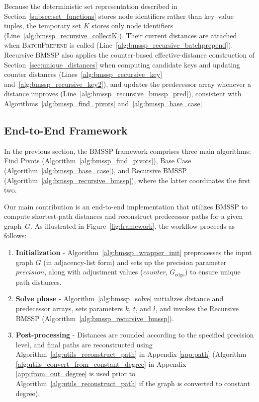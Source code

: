 \documentclass[ijoc,blindrev]{informs3} %
\begin{document}
Because the deterministic set representation described in Section~\ref{subsec:set_functions} stores node identifiers rather than key--value tuples, the temporary set $K$ stores only node identifiers (Line~\ref{alg:bmssp_recursive_collectK}). Their current distances are attached when \textsc{BatchPrepend} is called (Line~\ref{alg:bmssp_recursive_batchprepend}). Recursive BMSSP also applies the counter-based effective-distance construction of Section~\ref{sec:unique_distances} when computing candidate keys and updating counter distances (Lines~\ref{alg:bmssp_recursive_key} and~\ref{alg:bmssp_recursive_key2}), and updates the predecessor array whenever a distance improves (Line~\ref{alg:bmssp_recursive_bmssp_pred}), consistent with Algorithms~\ref{alg:bmssp_find_pivots} and~\ref{alg:bmssp_base_case}.




\subsection{End-to-End Framework}\label{subsec:alg_framework}

In the previous section, the BMSSP framework comprises three main algorithms: Find Pivots (Algorithm~\ref{alg:bmssp_find_pivots}), Base Case (Algorithm~\ref{alg:bmssp_base_case}), and Recursive BMSSP (Algorithm~\ref{alg:bmssp_recursive_bmssp}), where the latter coordinates the first two.

Our main contribution is an end-to-end implementation that utilizes BMSSP to compute shortest-path distances and reconstruct predecessor paths for a given graph~$G$. As illustrated in Figure~\ref{fig:framework}, the workflow proceeds as follows:

\begin{enumerate}
  \item \textbf{Initialization} - Algorithm~\ref{alg:bmssp_wrapper_init} preprocesses the input graph $G$ (in adjacency-list form) and sets up the precision parameter~$precision$, along with adjustment values (\textit{counter}, $G_{\text{edge}}$) to ensure unique path distances.
  \item \textbf{Solve phase} - Algorithm~\ref{alg:bmssp_solve} initializes distance and predecessor arrays, sets parameters $k$, $t$, and $l$, and invokes the Recursive BMSSP (Algorithm~\ref{alg:bmssp_recursive_bmssp}).
  \item \textbf{Post-processing} - Distances are rounded according to the specified precision level, and final paths are reconstructed using Algorithm~\ref{alg:utils_reconstruct_path} in Appendix \ref{app:path} (Algorithm \ref{alg:utils_convert_from_constant_degree} in Appendix \ref{app:from_out_degree} is used prior to Algorithm~\ref{alg:utils_reconstruct_path} if the graph is converted to constant degree).
\end{enumerate}
\end{document}
